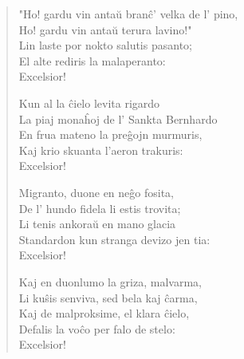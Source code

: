 \begin{verse}
            "Ho! gardu vin anta\u u bran\^c' velka de l' pino,\\
            Ho! gardu vin anta\u u terura lavino!"\\
            Lin laste por nokto salutis pasanto;\\
            El alte rediris la malaperanto:\\
                   \hspace*{3.5cm}                 Excelsior!

            Kun al la \^cielo levita rigardo\\
            La piaj mona\^hoj de l' Sankta Bernhardo\\
            En frua mateno la pre\^gojn murmuris,\\
            Kaj krio skuanta l'aeron trakuris:\\
                  \hspace*{3.5cm}                  Excelsior!

            Migranto, duone en ne\^go fosita,\\
            De l' hundo fidela li estis trovita;\\
            Li tenis ankora\u u en mano glacia\\
            Standardon kun stranga devizo jen tia:\\
                   \hspace*{3.5cm}                 Excelsior!

            Kaj en duonlumo la griza, malvarma,\\
            Li ku\^sis senviva, sed bela kaj \^carma,\\
            Kaj de malproksime, el klara \^cielo,\\
            Defalis la vo\^co per falo de stelo:\\
                  \hspace*{3.5cm}                  Excelsior!

\end{verse}


\smallrule{}


